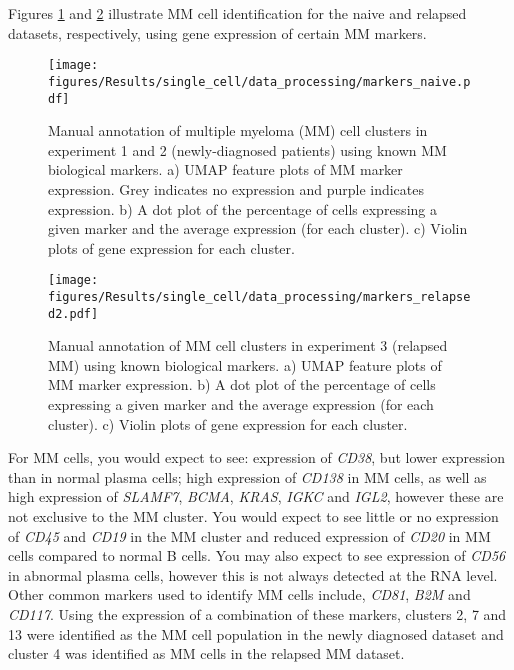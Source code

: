 Figures \ref{fig:mm_markers_naive} and \ref{fig:mm_markers_relapsed} illustrate MM cell identification for the naive and relapsed datasets, respectively, using gene expression of certain MM markers.
\begin{figure}[p]
    \centering
    \texttt{[image: figures/Results/single\_cell/data\_processing/markers\_naive.pdf]}
    \caption[MM cluster manual annotation- newly diagnosed MM]{Manual annotation of multiple myeloma (MM) cell clusters in experiment 1 and 2 (newly-diagnosed patients) using known MM biological markers.
    a) UMAP feature plots of MM marker expression.
    Grey indicates no expression and purple indicates expression.
    b) A dot plot of the percentage of cells expressing a given marker and the average expression (for each cluster).
    c) Violin plots of gene expression for each cluster.}
    \label{fig:mm_markers_naive}
\end{figure}
%
\begin{figure}[p]
    \centering
    \texttt{[image: figures/Results/single\_cell/data\_processing/markers\_relapsed2.pdf]}
    \caption[MM cluster manual annotation- relapsed MM]{Manual annotation of MM cell clusters in experiment 3 (relapsed MM) using known biological markers.
    a) UMAP feature plots of MM marker expression.
    b) A dot plot of the percentage of cells expressing a given marker and the average expression (for each cluster).
    c) Violin plots of gene expression for each cluster. }
    \label{fig:mm_markers_relapsed}
\end{figure}
%
For MM cells, you would expect to see: expression of \textit{CD38}, but lower expression than in normal plasma cells;
high expression of \textit{CD138} in MM cells, as well as high expression of \textit{SLAMF7}, \textit{BCMA}, \textit{KRAS}, \textit{IGKC} and \textit{IGL2}, however these are not exclusive to the MM cluster.
You would expect to see little or no expression of \textit{CD45} and \textit{CD19} in the MM cluster and reduced expression of \textit{CD20} in MM cells compared to normal B cells.
You may also expect to see expression of \textit{CD56} in abnormal plasma cells, however this is not always detected at the RNA level.
Other common markers used to identify MM cells include, \textit{CD81}, \textit{B2M} and \textit{CD117}.
Using the expression of a combination of these markers, clusters 2, 7 and 13 were identified as the MM cell population in the newly diagnosed dataset and cluster 4 was identified as MM cells in the relapsed MM dataset.

